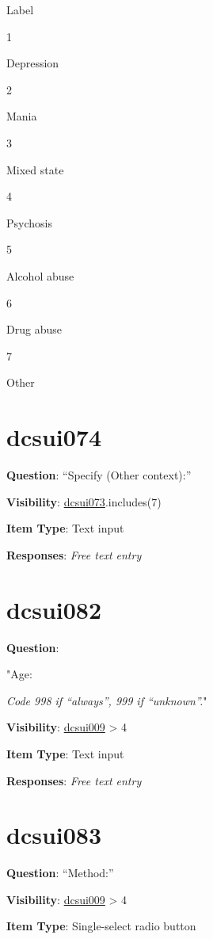 \documentclass[]{book}
\begin{document}
Label

1

Depression

2

Mania

3

Mixed state

4

Psychosis

5

Alcohol abuse

6

Drug abuse

7

Other

\hypertarget{dcsui074}{%
\section{dcsui074}\label{dcsui074}}

\textbf{Question}: ``Specify (Other context):''

\textbf{Visibility}: \protect\hyperlink{dcsui073}{dcsui073}.includes(7)

\textbf{Item Type}: Text input

\textbf{Responses}: \emph{Free text entry}

\hypertarget{dcsui082}{%
\section{dcsui082}\label{dcsui082}}

\textbf{Question}:

"Age:

\emph{Code 998 if ``always'', 999 if ``unknown''.}"

\textbf{Visibility}: \protect\hyperlink{dcsui009}{dcsui009} \textgreater{} 4

\textbf{Item Type}: Text input

\textbf{Responses}: \emph{Free text entry}

\hypertarget{dcsui083}{%
\section{dcsui083}\label{dcsui083}}

\textbf{Question}: ``Method:''

\textbf{Visibility}: \protect\hyperlink{dcsui009}{dcsui009} \textgreater{} 4

\textbf{Item Type}: Single-select radio button
\end{document}
